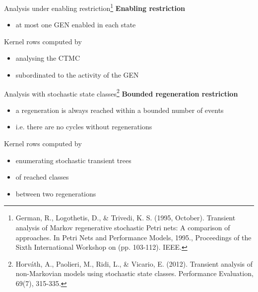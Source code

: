   \begin{frame}{Analysis under enabling restriction\footnote{German, R., Logothetis, D., \& Trivedi, K. S. (1995, October). Transient analysis of Markov regenerative stochastic Petri nets: A comparison of approaches. In Petri Nets and Performance Models, 1995., Proceedings of the Sixth International Workshop on (pp. 103-112). IEEE.}}
    \textbf{Enabling restriction}
    \begin{itemize}
      \item at most one GEN enabled in each state
    \end{itemize}
    
    \begin{center}\scalebox{0.7}{}\end{center}
    
    Kernel rows computed by
    \begin{itemize}
      \item analysing the CTMC
      \item subordinated to the activity of the GEN
    \end{itemize}
  \end{frame}
  
  \begin{frame}{Analysis with stochastic state classes\footnote{Horváth, A., Paolieri, M., Ridi, L., \& Vicario, E. (2012). Transient analysis of non-Markovian models using stochastic state classes. Performance Evaluation, 69(7), 315-335.}}
    \textbf{Bounded regeneration restriction}
    \begin{itemize}
      \item a regeneration is always reached within a bounded number of events
      \item i.e. there are no cycles without regenerations
    \end{itemize}
    
    \begin{center}\scalebox{0.7}{}\end{center}
    
    Kernel rows computed by
    \begin{itemize}
      \item enumerating stochastic transient trees
      \item of reached classes
      \item between two regenerations
    \end{itemize}
  \end{frame}
  
